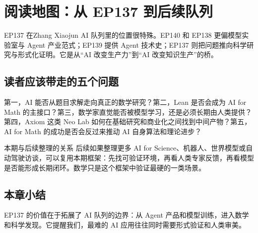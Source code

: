 \section{阅读地图：从 EP137 到后续队列}

EP137 在Zhang Xiaojun AI 队列里的位置很特殊。EP140 和 EP138 更偏模型实验室与 Agent 产业范式；EP139 提供 Agent 技术史；EP137 则把问题推向科学研究与形式化证明。它是从“AI 改变生产力”到“AI 改变知识生产”的桥。

\subsection{读者应该带走的五个问题}

第一，AI 能否从题目求解走向真正的数学研究？第二，Lean 是否会成为 AI for Math 的主接口？第三，数学家直觉能否被模型学习，还是必须长期由人类提供？第四，Axiom 这类 Neo Lab 如何在基础研究和商业化之间找到中间产物？第五，AI for Math 的成功是否会反过来推动 AI 自身算法和理论进步？

\begin{knowledgebox}{本期与后续整理的关系}
后续如果整理更多 AI for Science、机器人、世界模型或自动驾驶访谈，可以复用本期框架：先找可验证环境，再看人类专家反馈，再看模型是否能形成长期闭环。数学只是这个框架中验证最硬的一类场景。
\end{knowledgebox}

\subsection{本章小结}

EP137 的价值在于拓展了 AI 队列的边界：从 Agent 产品和模型训练，进入数学和科学发现。它提醒我们，最难的 AI 应用往往同时需要形式验证和人类审美。


